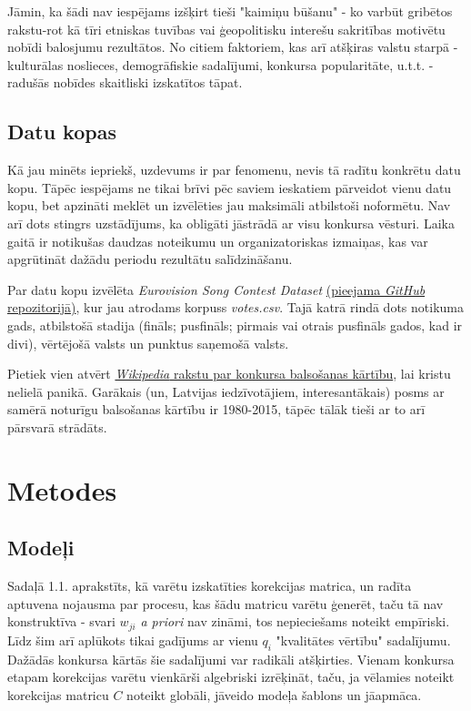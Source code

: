 \documentclass[12pt, a4paper]{article}
\begin{document}
Jāmin, ka šādi nav iespējams izšķirt tieši "kaimiņu būšanu" - ko varbūt gribētos rakstu-rot kā tīri etniskas tuvības vai ģeopolitisku interešu sakritības motivētu nobīdi balosjumu rezultātos. No citiem faktoriem, kas arī atšķiras valstu starpā - kulturālas noslieces, demogrāfiskie sadalījumi, konkursa popularitāte, u.t.t. - radušās nobīdes skaitliski izskatītos tāpat. 

\subsection{Datu kopas}

Kā jau minēts iepriekš, uzdevums ir par fenomenu, nevis tā radītu konkrētu datu kopu. Tāpēc iespējams ne tikai brīvi pēc saviem ieskatiem pārveidot vienu datu kopu, bet apzināti meklēt un izvēlēties jau maksimāli atbilstoši noformētu. Nav arī dots stingrs uzstādījums, ka obligāti jāstrādā ar visu konkursa vēsturi. Laika gaitā ir notikušas daudzas noteikumu un organizatoriskas izmaiņas, kas var apgrūtināt dažādu periodu rezultātu salīdzināšanu.

Par datu kopu izvēlēta \textit{Eurovision Song Contest Dataset} \href{https://github.com/Spijkervet/eurovision-dataset}{(pieejama \textit{GitHub} repozitorijā)}, kur jau atrodams korpuss \textit{votes.csv}. Tajā katrā rindā dots notikuma gads, atbilstošā stadija (fināls; pusfināls; pirmais vai otrais pusfināls gados, kad ir divi), vērtējošā valsts un punktus saņemošā valsts. 

Pietiek vien atvērt \href{https://en.wikipedia.org/wiki/Voting_at_the_Eurovision_Song_Contest}{\textit{Wikipedia} rakstu par konkursa balsošanas kārtību}, lai kristu nelielā panikā. Garākais (un, Latvijas iedzīvotājiem, interesantākais) posms ar samērā noturīgu balsošanas kārtību ir 1980-2015, tāpēc tālāk tieši ar to arī pārsvarā strādāts.

\newpage
\section{Metodes}

\subsection{Modeļi}

Sadaļā 1.1. aprakstīts, kā varētu izskatīties korekcijas matrica, un radīta aptuvena nojausma par procesu, kas šādu matricu varētu ģenerēt, taču tā nav konstruktīva - svari $w_{ji}$ \textit{a priori} nav zināmi, tos nepieciešams noteikt empīriski. Līdz šim arī aplūkots tikai gadījums ar vienu $q_i$ "kvalitātes vērtību" sadalījumu. Dažādās konkursa kārtās šie sadalījumi var radikāli atšķirties. Vienam konkursa etapam korekcijas varētu vienkārši algebriski izrēķināt, taču, ja vēlamies noteikt korekcijas matricu $C$ noteikt globāli, jāveido modeļa šablons un jāapmāca.
\end{document}
